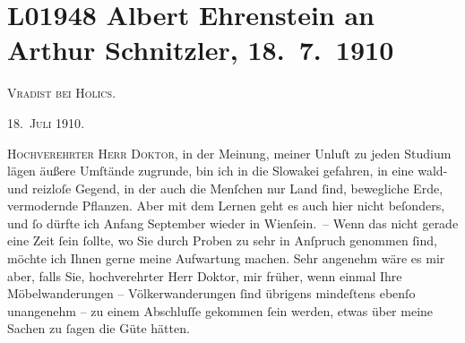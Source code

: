 

\section[Albert Ehrenstein an Arthur Schnitzler, 18. 7. 1910]{L01948 Albert Ehrenstein an Arthur Schnitzler, 18. 7. 1910}
\nopagebreak{}
\rehead{ }\normalsize\beginnumbering{}
\toendnotes[C]{\smallbreak\pagebreak[2]}
\toendnotes[C]{\smallbreak}
\pstart
           
\pstart
           {\pb}\textsc{Vradist bei Holics}.\pend
           
\pstart
           \raggedleft{}\textsc{18. Juli 1910}.\pend
           \pend
           
\pstart{}\textsc{Hochverehrter Herr Doktor,}\pend\vspace{0.5em}
\pstart
           in der Meinung, meiner Unluſt zu jeden Studium lägen äußere Umſtände zugrunde, bin
               ich in die Slowakei gefahren, in eine wald- und
               reizloſe Gegend, in der auch die Menſchen nur Land ſind, bewegliche Erde, vermodernde
               Pflanzen. Aber mit dem Lernen geht es auch hier nicht beſonders, und ſo dürfte ich
                  Anfang September wieder in Wienſein. – Wenn das nicht gerade eine Zeit ſein
               ſollte, wo Sie durch Proben zu sehr in Anſpruch genommen ſind, möchte ich Ihnen gerne
               meine Aufwartung machen. Sehr angenehm wäre es mir aber, falls Sie, hochverehrter
               Herr Doktor, {\pb}mir
               früher, wenn einmal Ihre Möbelwanderungen – Völkerwanderungen ſind übrigens
               mindeſtens ebenſo unangenehm – zu einem Abschluſſe gekommen ſein werden, etwas über
               meine Sachen zu ſagen die Güte hätten.\pend
           
